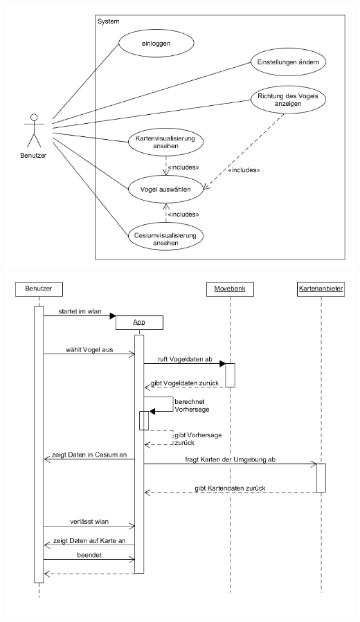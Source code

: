 \documentclass[12pt]{article} %
\begin{document}
\includegraphics[width = 1\linewidth]{Usecasediagramm.png}
\includegraphics[width = 1\linewidth]{Sequenzdiagramm.png}
\end{document}
